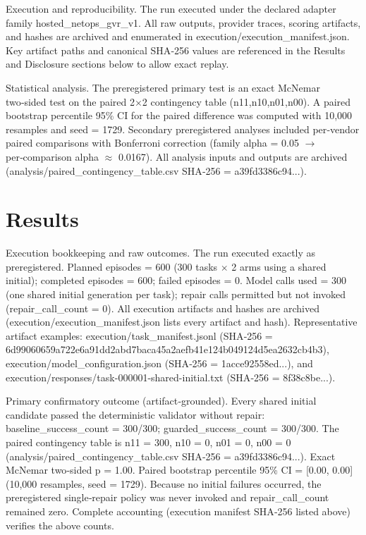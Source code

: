 \documentclass[conference]{IEEEtran}
\begin{document}
Execution and reproducibility. The run executed under the declared adapter family hosted\_netops\_gvr\_v1. All raw outputs, provider traces, scoring artifacts, and hashes are archived and enumerated in execution/execution\_manifest.json. Key artifact paths and canonical SHA‑256 values are referenced in the Results and Disclosure sections below to allow exact replay.

Statistical analysis. The preregistered primary test is an exact McNemar two‑sided test on the paired 2\ensuremath{\times}2 contingency table (n11,n10,n01,n00). A paired bootstrap percentile 95\% CI for the paired difference was computed with 10,000 resamples and seed = 1729. Secondary preregistered analyses included per‑vendor paired comparisons with Bonferroni correction (family alpha = 0.05 \ensuremath{\rightarrow} per‑comparison alpha \ensuremath{\approx} 0.0167). All analysis inputs and outputs are archived (analysis/paired\_contingency\_table.csv SHA‑256 = a39fd3386c94...).

\section{Results}
Execution bookkeeping and raw outcomes. The run executed exactly as preregistered. Planned episodes = 600 (300 tasks \ensuremath{\times} 2 arms using a shared initial); completed episodes = 600; failed episodes = 0. Model calls used = 300 (one shared initial generation per task); repair calls permitted but not invoked (repair\_call\_count = 0). All execution artifacts and hashes are archived (execution/execution\_manifest.json lists every artifact and hash). Representative artifact examples: execution/task\_manifest.jsonl (SHA‑256 = 6d99060659a722e6a91dd2abd7baca45a2aefb41e124b049124d5ea2632cb4b3), execution/model\_configuration.json (SHA‑256 = 1acce92558ed...), and execution/responses/task-000001-shared-initial.txt (SHA‑256 = 8f38c8be...).

Primary confirmatory outcome (artifact‑grounded). Every shared initial candidate passed the deterministic validator without repair: baseline\_success\_count = 300/300; guarded\_success\_count = 300/300. The paired contingency table is n11 = 300, n10 = 0, n01 = 0, n00 = 0 (analysis/paired\_contingency\_table.csv SHA‑256 = a39fd3386c94...). Exact McNemar two‑sided p = 1.00. Paired bootstrap percentile 95\% CI = [0.00, 0.00] (10,000 resamples, seed = 1729). Because no initial failures occurred, the preregistered single‑repair policy was never invoked and repair\_call\_count remained zero. Complete accounting (execution manifest SHA‑256 listed above) verifies the above counts.
\end{document}
